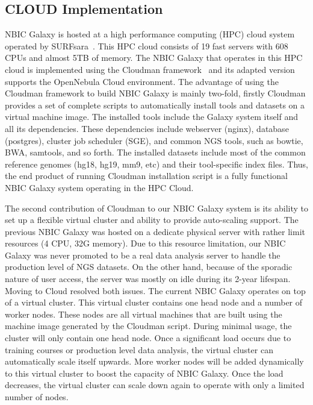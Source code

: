 \subsection*{CLOUD Implementation}

NBIC Galaxy is hosted at a high performance computing (HPC) cloud system operated by SURFsara~\cite{url-surfsara}. This HPC cloud consists of 19 fast servers with 608 CPUs and almost 5TB of memory. The NBIC Galaxy that operates in this HPC cloud is implemented using the Cloudman framework~\cite{afgan} and its adapted version supports the OpenNebula Cloud environment. The advantage of using the Cloudman framework to build NBIC Galaxy is mainly two-fold, firstly Cloudman provides a set of complete scripts to automatically install tools and datasets on a virtual machine image. The installed tools include the Galaxy system itself and all its dependencies. These dependencies include webserver (nginx), database (postgres), cluster job scheduler (SGE), and common NGS tools, such as bowtie, BWA, samtools, and so forth. The installed datasets include most of the common reference genomes (hg18, hg19, mm9, etc) and their tool-specific index files. Thus, the end product of running Cloudman installation script is a fully functional NBIC Galaxy system operating in the HPC Cloud.

The second contribution of Cloudman to our NBIC Galaxy system is its ability to set up a flexible virtual cluster and ability to provide auto-scaling support. The previous NBIC Galaxy was hosted on a dedicate physical server with rather limit resources (4 CPU, 32G memory). Due to this resource limitation, our NBIC Galaxy was never promoted to be a real data analysis server to handle the production level of NGS datasets. On the other hand, because of the sporadic nature of user access, the server was mostly on idle during its 2-year lifespan. Moving to Cloud resolved both issues. The current NBIC Galaxy operates on top of a virtual cluster. This virtual cluster contains one head node and a number of worker nodes. These nodes are all virtual machines that are built using the machine image generated by the Cloudman script. During minimal usage, the cluster will only contain one head node. Once a significant load occurs due to training courses or production level data analysis, the virtual cluster can automatically scale itself upwards. More worker nodes will be added dynamically to this virtual cluster to boost the capacity of NBIC Galaxy. Once the load decreases, the virtual cluster can scale down again to operate with only a limited number of nodes.


